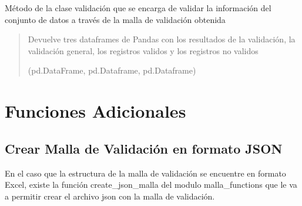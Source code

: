 \documentclass[letterpaper,10pt,spanish]{sphinxmanual}
\begin{document}
\begin{fulllineitems}
\label{\detokenize{index:MallaValidacionRuta.validacion.validar_datos}}
\pysigstartsignatures
{}
\pysigstopsignatures
\sphinxAtStartPar
Método de la clase validación que se encarga de validar la información del conjunto de datos a través de la malla de validación obtenida
\begin{quote}\begin{description}
\sphinxAtStartPar
Devuelve tres dataframes de Pandas con los resultados de la validación, la validación general,
los registros validos y los registros no validos

\sphinxAtStartPar
(pd.DataFrame, pd.Dataframe, pd.Dataframe)

\end{description}\end{quote}

\end{fulllineitems}



\chapter{Funciones Adicionales}
\label{\detokenize{index:funciones-adicionales}}

\section{Crear Malla de Validación en formato JSON}
\label{\detokenize{index:crear-malla-de-validacion-en-formato-json}}
\sphinxAtStartPar
En el caso que la estructura de la malla de validación se encuentre en formato Excel, existe la función create\_json\_malla del modulo malla\_functions que le va a permitir crear el archivo json con la malla de validación.
\end{document}

